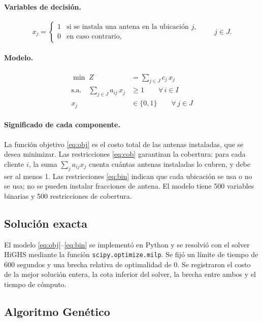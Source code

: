 \paragraph{Variables de decisión.}
\[
x_j=\begin{cases}1 & \text{si se instala una antena en la ubicación } j,\\ 0 & \text{en caso contrario,}\end{cases}\qquad j\in J.
\]

\paragraph{Modelo.}
\begin{align}
\min\; Z &= \sum_{j\in J} c_j\,x_j \label{eq:obj}\\
\text{s.a.}\quad \sum_{j\in J} a_{ij}\,x_j &\ge 1 \qquad \forall\, i\in I \label{eq:cob}\\
x_j &\in\{0,1\} \qquad \forall\, j\in J \label{eq:bin}
\end{align}

\paragraph{Significado de cada componente.}
La función objetivo \eqref{eq:obj} es el costo total de las antenas instaladas, que se desea minimizar. Las restricciones \eqref{eq:cob} garantizan la cobertura: para cada cliente $i$, la suma $\sum_j a_{ij}x_j$ cuenta cuántas antenas instaladas lo cubren, y debe ser al menos 1. Las restricciones \eqref{eq:bin} indican que cada ubicación se usa o no se usa; no se pueden instalar fracciones de antena. El modelo tiene 500 variables binarias y 500 restricciones de cobertura.

\subsection{Solución exacta}
El modelo \eqref{eq:obj}--\eqref{eq:bin} se implementó en Python y se resolvió con el solver HiGHS \cite{highs18} mediante la función \texttt{scipy.optimize.milp}. Se fijó un límite de tiempo de 600 segundos y una brecha relativa de optimalidad de 0. Se registraron el costo de la mejor solución entera, la cota inferior del solver, la brecha entre ambos y el tiempo de cómputo.

\subsection{Algoritmo Genético}

